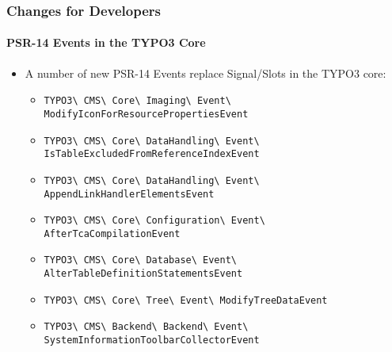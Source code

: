 \begin{frame}[fragile]
	\frametitle{Changes for Developers}
	\framesubtitle{PSR-14 Events in the TYPO3 Core}

	\begin{itemize}
		\item A number of new PSR-14 Events replace Signal/Slots in the TYPO3 core:
			\newline

			\begin{itemize}\tiny
				\item \texttt{TYPO3\textbackslash
					CMS\textbackslash
					Core\textbackslash
					Imaging\textbackslash
					Event\textbackslash
					ModifyIconForResourcePropertiesEvent}
					\newline
				\item \texttt{TYPO3\textbackslash
					CMS\textbackslash
					Core\textbackslash
					DataHandling\textbackslash
					Event\textbackslash
					IsTableExcludedFromReferenceIndexEvent}
					\newline
				\item \texttt{TYPO3\textbackslash
					CMS\textbackslash
					Core\textbackslash
					DataHandling\textbackslash
					Event\textbackslash
					AppendLinkHandlerElementsEvent}
					\newline
				\item \texttt{TYPO3\textbackslash
					CMS\textbackslash
					Core\textbackslash
					Configuration\textbackslash
					Event\textbackslash
					AfterTcaCompilationEvent}
					\newline
				\item \texttt{TYPO3\textbackslash
					CMS\textbackslash
					Core\textbackslash
					Database\textbackslash
					Event\textbackslash
					AlterTableDefinitionStatementsEvent}
					\newline
				\item \texttt{TYPO3\textbackslash
					CMS\textbackslash
					Core\textbackslash
					Tree\textbackslash
					Event\textbackslash
					ModifyTreeDataEvent}
					\newline
				\item \texttt{TYPO3\textbackslash
					CMS\textbackslash
					Backend\textbackslash
					Backend\textbackslash
					Event\textbackslash
					SystemInformationToolbarCollectorEvent}
					\newline
			\end{itemize}

	\end{itemize}

\end{frame}

